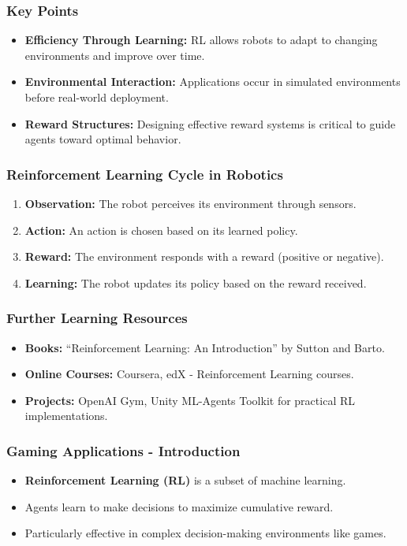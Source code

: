 \documentclass[aspectratio=169]{beamer}
\begin{document}
\begin{frame}[fragile]
    \frametitle{Key Points}
    \begin{itemize}
        \item \textbf{Efficiency Through Learning:} RL allows robots to adapt to changing environments and improve over time.
        \item \textbf{Environmental Interaction:} Applications occur in simulated environments before real-world deployment.
        \item \textbf{Reward Structures:} Designing effective reward systems is critical to guide agents toward optimal behavior.
    \end{itemize}
\end{frame}

\begin{frame}[fragile]
    \frametitle{Reinforcement Learning Cycle in Robotics}
    \begin{enumerate}
        \item \textbf{Observation:} The robot perceives its environment through sensors.
        \item \textbf{Action:} An action is chosen based on its learned policy.
        \item \textbf{Reward:} The environment responds with a reward (positive or negative).
        \item \textbf{Learning:} The robot updates its policy based on the reward received.
    \end{enumerate}
\end{frame}

\begin{frame}[fragile]
    \frametitle{Further Learning Resources}
    \begin{itemize}
        \item \textbf{Books:} “Reinforcement Learning: An Introduction” by Sutton and Barto.
        \item \textbf{Online Courses:} Coursera, edX - Reinforcement Learning courses.
        \item \textbf{Projects:} OpenAI Gym, Unity ML-Agents Toolkit for practical RL implementations.
    \end{itemize}
\end{frame}

\begin{frame}[fragile]
    \frametitle{Gaming Applications - Introduction}
    \begin{itemize}
        \item \textbf{Reinforcement Learning (RL)} is a subset of machine learning.
        \item Agents learn to make decisions to maximize cumulative reward.
        \item Particularly effective in complex decision-making environments like games.
    \end{itemize}
\end{frame}
\end{document}
